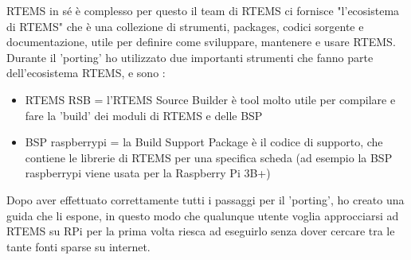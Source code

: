 \documentclass[12pt, a4paper, titlepage, oneside]{book}
\begin{document}
\begin{flushleft}
RTEMS in sé è complesso per questo il team di RTEMS ci fornisce "l'ecosistema di RTEMS" che è una collezione di strumenti, packages, codici sorgente e documentazione, utile per definire come sviluppare, mantenere e usare RTEMS.\\
Durante il 'porting' ho utilizzato due importanti strumenti che fanno parte dell'ecosistema RTEMS, e sono :
\begin{itemize}
    \item RTEMS RSB = l'RTEMS Source Builder è tool molto utile per compilare e fare la 'build' dei moduli di RTEMS e delle BSP 
    \item BSP  raspberrypi = la Build Support Package è il codice di supporto, che contiene le librerie di RTEMS per una specifica scheda (ad esempio la BSP raspberrypi viene usata per la Raspberry Pi 3B+)
\end{itemize}
Dopo aver effettuato correttamente tutti i passaggi per il 'porting', ho creato una guida che li espone, in questo modo che qualunque utente voglia approcciarsi ad RTEMS su RPi per la prima volta riesca ad eseguirlo senza dover cercare tra le tante fonti sparse su internet.


\end{flushleft}
\end{document}
